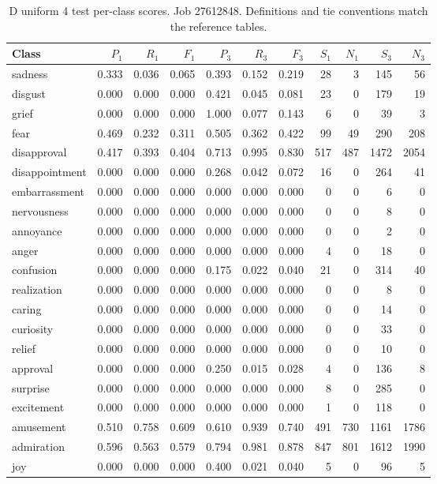 \begin{table}[!htbp]
\centering
\scriptsize
\setlength{\tabcolsep}{5pt}
\begin{tabular}{lrrrrrrrrrr}
\toprule
Class & $P_1$ & $R_1$ & $F_1$ & $P_3$ & $R_3$ & $F_3$ & $S_1$ & $N_1$ & $S_3$ & $N_3$ \\
\midrule
sadness & 0.333 & 0.036 & 0.065 & 0.393 & 0.152 & 0.219 & 28 & 3 & 145 & 56 \\
disgust & 0.000 & 0.000 & 0.000 & 0.421 & 0.045 & 0.081 & 23 & 0 & 179 & 19 \\
grief & 0.000 & 0.000 & 0.000 & 1.000 & 0.077 & 0.143 & 6 & 0 & 39 & 3 \\
fear & 0.469 & 0.232 & 0.311 & 0.505 & 0.362 & 0.422 & 99 & 49 & 290 & 208 \\
disapproval & 0.417 & 0.393 & 0.404 & 0.713 & 0.995 & 0.830 & 517 & 487 & 1472 & 2054 \\
disappointment & 0.000 & 0.000 & 0.000 & 0.268 & 0.042 & 0.072 & 16 & 0 & 264 & 41 \\
embarrassment & 0.000 & 0.000 & 0.000 & 0.000 & 0.000 & 0.000 & 0 & 0 & 6 & 0 \\
nervousness & 0.000 & 0.000 & 0.000 & 0.000 & 0.000 & 0.000 & 0 & 0 & 8 & 0 \\
annoyance & 0.000 & 0.000 & 0.000 & 0.000 & 0.000 & 0.000 & 0 & 0 & 2 & 0 \\
anger & 0.000 & 0.000 & 0.000 & 0.000 & 0.000 & 0.000 & 4 & 0 & 18 & 0 \\
confusion & 0.000 & 0.000 & 0.000 & 0.175 & 0.022 & 0.040 & 21 & 0 & 314 & 40 \\
realization & 0.000 & 0.000 & 0.000 & 0.000 & 0.000 & 0.000 & 0 & 0 & 8 & 0 \\
caring & 0.000 & 0.000 & 0.000 & 0.000 & 0.000 & 0.000 & 0 & 0 & 14 & 0 \\
curiosity & 0.000 & 0.000 & 0.000 & 0.000 & 0.000 & 0.000 & 0 & 0 & 33 & 0 \\
relief & 0.000 & 0.000 & 0.000 & 0.000 & 0.000 & 0.000 & 0 & 0 & 10 & 0 \\
approval & 0.000 & 0.000 & 0.000 & 0.250 & 0.015 & 0.028 & 4 & 0 & 136 & 8 \\
surprise & 0.000 & 0.000 & 0.000 & 0.000 & 0.000 & 0.000 & 8 & 0 & 285 & 0 \\
excitement & 0.000 & 0.000 & 0.000 & 0.000 & 0.000 & 0.000 & 1 & 0 & 118 & 0 \\
amusement & 0.510 & 0.758 & 0.609 & 0.610 & 0.939 & 0.740 & 491 & 730 & 1161 & 1786 \\
admiration & 0.596 & 0.563 & 0.579 & 0.794 & 0.981 & 0.878 & 847 & 801 & 1612 & 1990 \\
joy & 0.000 & 0.000 & 0.000 & 0.400 & 0.021 & 0.040 & 5 & 0 & 96 & 5 \\
\bottomrule
\end{tabular}
\caption{D uniform 4 test per-class scores. Job 27612848. Definitions and tie conventions match the reference tables.}
\label{tab:classes-d_uniform_k4}
\end{table}
